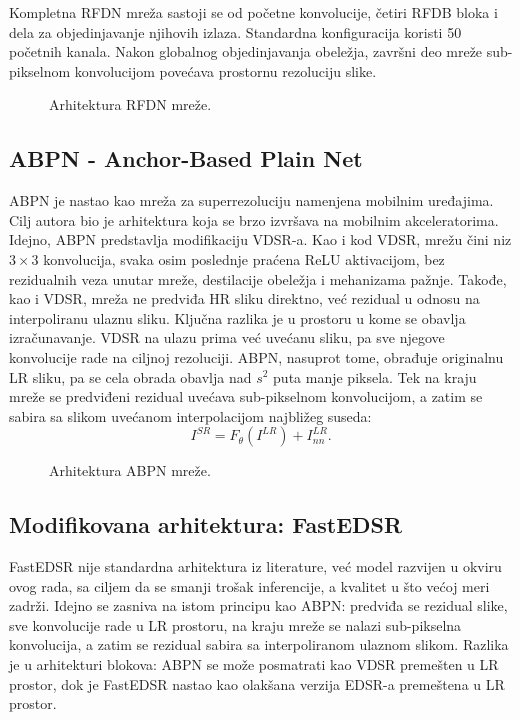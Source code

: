 \documentclass[12pt,a4paper]{article}
\begin{document}
Kompletna RFDN mreža sastoji se od početne konvolucije, četiri RFDB bloka i dela za objedinjavanje njihovih izlaza. Standardna konfiguracija koristi 50 početnih kanala. Nakon globalnog objedinjavanja obeležja, završni deo mreže sub-pikselnom konvolucijom povećava prostornu rezoluciju slike.


\begin{figure}[H]
	\centering
	\resizebox{\textwidth}{!}{}
	\caption{Arhitektura RFDN mreže.}
	\label{fig:rfdn}
\end{figure}

\subsection{ABPN - Anchor-Based Plain Net}
\label{sec:abpn}

ABPN \cite{ABPN} je nastao kao mreža za superrezoluciju namenjena mobilnim uređajima. Cilj autora bio je arhitektura koja se brzo izvršava na mobilnim akceleratorima. Idejno, ABPN predstavlja modifikaciju VDSR-a. Kao i kod VDSR, mrežu čini niz $3\times3$ konvolucija, svaka osim poslednje praćena ReLU aktivacijom, bez rezidualnih veza unutar mreže, destilacije obeležja i mehanizama pažnje. Takođe, kao i VDSR, mreža ne predviđa HR sliku direktno, već rezidual u odnosu na interpoliranu ulaznu sliku. Ključna razlika je u prostoru u kome se obavlja izračunavanje. VDSR na ulazu prima već uvećanu sliku, pa sve njegove konvolucije rade na ciljnoj rezoluciji. ABPN, nasuprot tome, obrađuje originalnu LR sliku, pa se cela obrada obavlja nad $s^2$ puta manje piksela. Tek na kraju mreže se predviđeni rezidual uvećava sub-pikselnom konvolucijom, a zatim se sabira sa slikom uvećanom interpolacijom najbližeg suseda:
\begin{equation}
	I^{SR} = F_{\theta}(I^{LR}) + I^{LR}_{nn}.
\end{equation}

\begin{figure}[H]
	\centering
	\resizebox{0.9\textwidth}{!}{}
	\caption{Arhitektura ABPN mreže.}
	\label{fig:abpn}
\end{figure}

\subsection{Modifikovana arhitektura: FastEDSR}
\label{sec:fastedsr}

FastEDSR nije standardna arhitektura iz literature, već model razvijen u okviru ovog rada, sa ciljem da se smanji trošak inferencije, a kvalitet u što većoj meri zadrži. Idejno se zasniva na istom principu kao ABPN: predviđa se rezidual slike, sve konvolucije rade u LR prostoru, na kraju mreže se nalazi sub-pikselna konvolucija, a zatim se rezidual sabira sa interpoliranom ulaznom slikom. Razlika je u arhitekturi blokova: ABPN se može posmatrati kao VDSR premešten u LR prostor, dok je FastEDSR nastao kao olakšana verzija EDSR-a premeštena u LR prostor.
\end{document}
